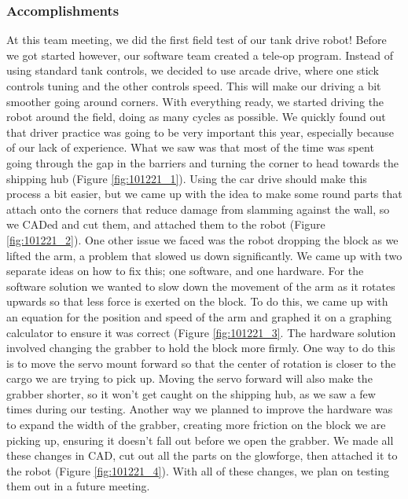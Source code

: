 \subsubsection*{Accomplishments}
At this team meeting, we did the first field test of our tank drive robot!  Before we got started however, our software team created a tele-op program. Instead of using standard tank controls, we decided to use arcade drive, where one stick controls tuning and the other controls speed. This will make our driving a bit smoother going around corners. With everything ready, we started driving the robot around the field, doing as many cycles as possible. We quickly found out that driver practice was going to be very important this year, especially because of our lack of experience. What we saw was that most of the time was spent going through the gap in the barriers and turning the corner to head towards the shipping hub (Figure \ref{fig:101221_1}). Using the car drive should make this process a bit easier, but we came up with the idea to make some round parts that attach onto the corners that reduce damage from slamming against the wall, so we CADed and cut them, and attached them to the robot (Figure \ref{fig:101221_2}). 
One other issue we faced was the robot dropping the block as we lifted the arm, a problem that slowed us down significantly. We came up with two separate ideas on how to fix this; one software, and one hardware. For the software solution we wanted to slow down the movement of the arm as it rotates upwards so that less force is exerted on the block. To do this, we came up with an equation for the position and speed of the arm and graphed it on a graphing calculator to ensure it was correct (Figure \ref{fig:101221_3}. The hardware solution involved changing the grabber to hold the block more firmly. One way to do this is to move the servo mount forward so that the center of rotation is closer to the cargo we are trying to pick up. Moving the servo forward will also make the grabber shorter, so it won't get caught on the shipping hub, as we saw a few times during our testing.  Another way we planned to improve the hardware was to expand the width of the grabber, creating more friction on the block we are picking up, ensuring it doesn’t fall out before we open the grabber. We made all these changes in CAD, cut out all the parts on the glowforge, then attached it to the robot (Figure \ref{fig:101221_4}). With all of these changes, we plan on testing them out in a future meeting.
 


